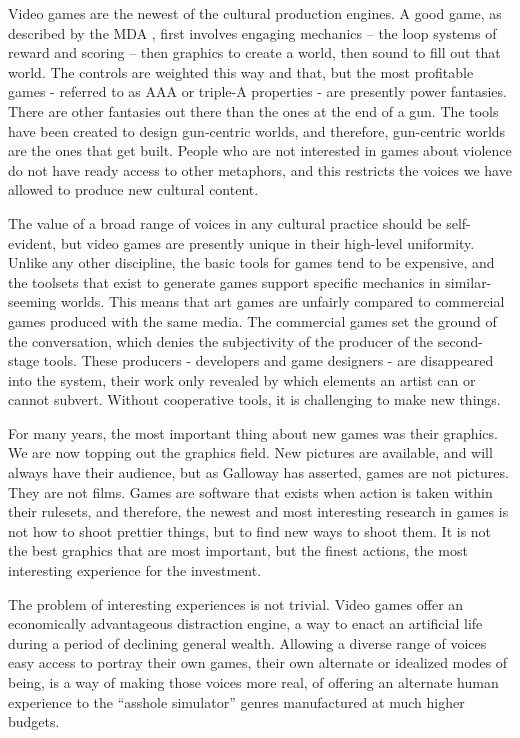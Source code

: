 Video games are the newest of the cultural production engines. A good game, as described by the MDA \cite{mda}, first involves engaging mechanics – the loop systems of reward and scoring – then graphics to create a world, then sound to fill out that world. The controls are weighted this way and that, but the most profitable games - referred to as AAA or triple-A properties - are presently power fantasies. There are other fantasies out there than the ones at the end of a gun. The tools have been created to design gun-centric worlds, and therefore, gun-centric worlds are the ones that get built. People who are not interested in games about violence do not have ready access to other metaphors, and this restricts the voices we have allowed to produce new cultural content.

The value of a broad range of voices in any cultural practice should be self-evident, but video games are presently unique in their high-level uniformity. Unlike any other discipline, the basic tools for games tend to be expensive, and the toolsets that exist to generate games support specific mechanics in similar-seeming worlds. This means that art games are unfairly compared to commercial games produced with the same media. The commercial games set the ground of the conversation, which denies the subjectivity of the producer of the second-stage tools. These producers - developers and game designers - are disappeared into the system, their work only revealed by which elements an artist can or cannot subvert. Without cooperative tools, it is challenging to make new things.

For many years, the most important thing about new games was their graphics. We are now topping out the graphics field. New pictures are available, and will always have their audience, but as Galloway has asserted, games are not pictures. They are not films. Games are software that exists when action is taken within their rulesets, and therefore, the newest and most interesting research in games is not how to shoot prettier things, but to find new ways to shoot them. It is not the best graphics that are most important, but the finest actions, the most interesting experience for the investment.

The problem of interesting experiences is not trivial. Video games offer an economically advantageous distraction engine, a way to enact an artificial life during a period of declining general wealth. Allowing a diverse range of voices easy access to portray their own games, their own alternate or idealized modes of being, is a way of making those voices more real, of offering an alternate human experience to the “asshole simulator” \cite{bissell} genres manufactured at much higher budgets.

